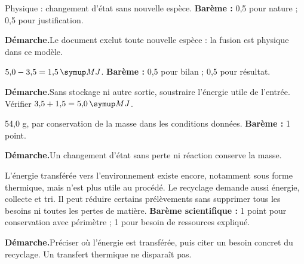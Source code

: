 \par\noindent\begin{minipage}{\linewidth}
Physique : changement d’état sans nouvelle espèce. \textbf{Barème :} 0,5 pour nature ; 0,5 pour justification.\par
\smallskip\noindent\textbf{Démarche.}\enspace Le document exclut toute nouvelle espèce : la fusion est physique dans ce modèle.\par
\end{minipage}\par
\par\noindent\begin{minipage}{\linewidth}
$5{,}0-3{,}5=1{,}5\unite{MJ}$. \textbf{Barème :} 0,5 pour bilan ; 0,5 pour résultat.\par
\smallskip\noindent\textbf{Démarche.}\enspace Sans stockage ni autre sortie, soustraire l’énergie utile de l’entrée. Vérifier $3{,}5+1{,}5=5{,}0\unite{MJ}$.\par
{}
\end{minipage}\par
\par\noindent\begin{minipage}{\linewidth}
54,0 g, par conservation de la masse dans les conditions données. \textbf{Barème :} 1 point.\par
\smallskip\noindent\textbf{Démarche.}\enspace Un changement d’état sans perte ni réaction conserve la masse.\par
\end{minipage}\par
\par\noindent\begin{minipage}{\linewidth}
L’énergie transférée vers l’environnement existe encore, notamment sous forme thermique, mais n’est plus utile au procédé. Le recyclage demande aussi énergie, collecte et tri. Il peut réduire certains prélèvements sans supprimer tous les besoins ni toutes les pertes de matière. \textbf{Barème scientifique :} 1 point pour conservation avec périmètre ; 1 pour besoin de ressources expliqué.\par
\smallskip\noindent\textbf{Démarche.}\enspace Préciser où l’énergie est transférée, puis citer un besoin concret du recyclage. Un transfert thermique ne disparaît pas.\par
\end{minipage}\par
